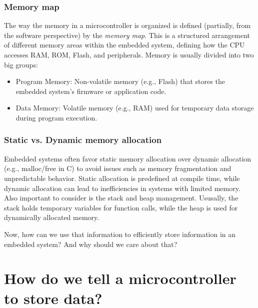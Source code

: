 \documentclass[aspectratio=169]{beamer}
\begin{document}
\begin{frame}
  \frametitle{Memory map}
  The way the memory in a microcontroller is organized is defined (partially, from the software perspective) by the \textit{memory map}. \pause
  This is a structured arrangement of different memory areas within the embedded system, defining how the CPU accesses RAM, ROM, Flash, and peripherals. \pause
  Memory is usually divided into two big groups:
  \begin{itemize}
    \item Program Memory: Non-volatile memory (e.g., Flash) that stores the embedded system's firmware or application code.
    \item Data Memory: Volatile memory (e.g., RAM) used for temporary data storage during program execution.
  \end{itemize}
\end{frame}

\begin{frame}
  \frametitle{Static vs. Dynamic memory allocation}
  Embedded systems often favor static memory allocation over dynamic allocation (e.g., malloc/free in C) to avoid issues such as memory fragmentation and unpredictable behavior. Static allocation is predefined at compile time, while dynamic allocation can lead to inefficiencies in systems with limited memory.\\ \pause
  Also important to consider is the stack and heap management. Ususally, the stack holds temporary variables for function calls, while the heap is used for dynamically allocated memory.
\end{frame}

\begin{frame}
  Now, how can we use that information to efficiently store information in an embedded system? And why should we care about that?
\end{frame}

\section{How do we tell a microcontroller to store data?}
\end{document}
